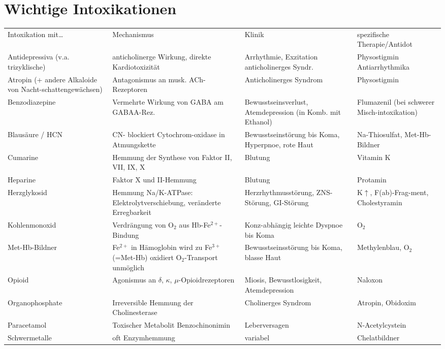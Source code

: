 \documentclass[10pt,a4paper]{report}
\begin{document}
\section{Wichtige Intoxikationen} %
\label{sec:wichtige_intoxikationen}
\begin{tabularx}{\textwidth}{XXXX}
Intoxikation mit…&Mechanismus&Klinik&spezifische Therapie/Antidot\\
Antidepressiva (v.a. trizyklische)&anticholinerge Wirkung, direkte Kardiotoxizität&Arrhythmie, Exzitation anticholinerges Syndr. &Physostigmin Antiarrhythmika\\
Atropin (+ andere Alkaloide von Nacht-schattengewächsen)&Antagonismus an musk. ACh-Rezeptoren&Anticholinerges Syndrom&Physostigmin\\
Benzodiazepine&Vermehrte Wirkung von GABA am GABAA-Rez.&Bewusstseinsverlust, Atemdepression (in Komb. mit Ethanol)&Flumazenil (bei schwerer Misch-intoxikation)\\
Blausäure / HCN&CN- blockiert Cytochrom-oxidase in Atmungskette &Bewusstseinstörung bis Koma, Hyperpnoe, rote Haut&Na-Thiosulfat, Met-Hb-Bildner\\
Cumarine&Hemmung der Synthese von Faktor II, VII, IX, X&Blutung&Vitamin K\\
Heparine&Faktor X und II-Hemmung&Blutung&Protamin\\
Herzglykosid&Hemmung Na/K-ATPase: Elektrolytverschiebung, veränderte Erregbarkeit&Herzrhythmusstörung, ZNS-Störung, GI-Störung&K$\uparrow$, F(ab)-Frag-ment, Cholestyramin\\
Kohlenmonoxid&Verdrängung von O$_2$ aus Hb-Fe$^{2+}$-Bindung&Konz-abhängig leichte Dyspnoe bis Koma&O$_2$\\
Met-Hb-Bildner&Fe$^{2+}$ in Hämoglobin wird zu Fe$^{3+}$ (=Met-Hb) oxidiert O$_2$-Transport unmöglich&Bewusstseinsstörung bis Koma, blasse Haut&Methylenblau, O$_2$\\
Opioid&Agonismus an $\delta$, $\kappa$, $\mu$-Opioidrezeptoren&Miosis, Bewusstlosigkeit, Atemdepression&Naloxon\\
Organophosphate&Irreversible Hemmung der Cholinesterase&Cholinerges Syndrom&Atropin, Obidoxim\\
Paracetamol&Toxischer Metabolit Benzochinonimin&Leberversagen&N-Acetylcystein\\
Schwermetalle&oft Enzymhemmung&variabel&Chelatbildner\\
\end{tabularx}
\end{document}
